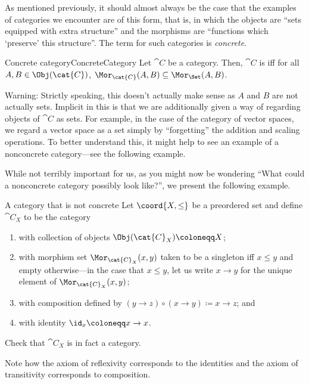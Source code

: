 As mentioned previously, it should almost always be the case that the examples of categories we encounter are of this form, that is, in which the objects are ``sets equipped with extra structure'' and the morphisms are ``functions which `preserve' this structure''.  The term for such categories is \emph{concrete}.
\begin{dfn}{Concrete category}{ConcreteCategory}
Let $\cat{C}$ be a category.  Then, $\cat{C}$ is  iff for all $A,B\in \Obj (\cat{C})$, $\Mor _{\cat{C}}(A,B)\subseteq \Mor _{\Set}(A,B)$.
\begin{rmk}
Warning:  Strictly speaking, this doesn't actually make sense as $A$ and $B$ are not actually sets.  Implicit in this is that we are additionally given a way of regarding objects of $\cat{C}$ as sets.  For example, in the case of the category of vector spaces, we regard a vector space as a set simply by ``forgetting'' the addition and scaling operations.  To better understand this, it might help to see an example of a nonconcrete category---see the following example.
\end{rmk}
\end{dfn}
While not terribly important for us, as you might now be wondering ``What could a nonconcrete category possibly look like?'', we present the following example.
\begin{exm}{A category that is not concrete}{}
Let $\coord{X,\leq}$ be a preordered set and define $\cat{C}_X$ to be the category
\begin{enumerate}
\item with collection of objects $\Obj (\cat{C}_X)\coloneqq X$;
\item with morphism set $\Mor _{\cat{C}_X}(x,y)$  taken to be a singleton iff $x\leq y$ and empty otherwise---in the case that $x\leq y$, let us write $x\rightarrow y$ for the unique element of $\Mor _{\cat{C}_X}(x,y)$;
\item with composition defined by $(y\rightarrow z)\circ (x\rightarrow y)\coloneqq x\rightarrow z$; and
\item with identity $\id _x\coloneqq x\rightarrow x$.
\end{enumerate}
\begin{exr}{}{}
Check that $\cat{C}_X$ is in fact a category.
\begin{rmk}
Note how the axiom of reflexivity corresponds to the identities and the axiom of transitivity corresponds to composition.
\end{rmk}
\end{exr} 
\end{exm}

